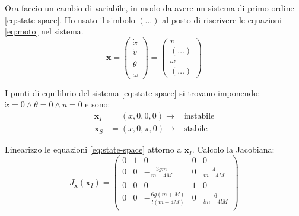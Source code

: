 Ora faccio un cambio di variabile, in modo da avere un sistema di primo ordine \eqref{eq:state-space}.
Ho usato il simbolo $(\ldots)$ al posto di riscrivere le equazioni \eqref{eq:moto} nel sistema.
\begin{equation}
  \dot {\mathbf x} = \left(
  \begin{matrix}
    \dot x \\
    \dot v \\
    \dot \theta \\
    \dot \omega
  \end{matrix}\right) = \left(
  \begin{matrix}
    v \\
    (\ldots) \\
    \omega \\
    (\ldots)
  \end{matrix}
  \right)
  \label{eq:state-space}
\end{equation}

I punti di equilibrio del sistema \eqref{eq:state-space} si trovano imponendo: $\dot x = 0 \land \dot \theta = 0
\land u = 0$ e sono:
\begin{equation}
  \begin{aligned}
    \mathbf x_I &= (x, 0, 0, 0) \to & \text{instabile} \\
    \mathbf x_S &= (x, 0, \pi, 0) \to & \text{stabile}
  \end{aligned}
  \label{eq:punti-equilibrio}
\end{equation}

Linearizzo le equazioni \eqref{eq:state-space} attorno a $\mathbf x_I$.
Calcolo la Jacobiana:
\begin{equation}
  J_{\dot{\mathbf x}}(\mathbf x_I) =
  \left(\begin{array}{ccccc}0&1&0&0&0\\0&0&-\frac{3gm}{m+4M}&0&\frac{4}{m+4M}\\0&0&0&1&0\\0&0&-\frac{6g(m+M)}{l(m+4M)}&0&\frac{6}{lm+4lM}\\\end{array}\right)
  \label{eq:jacobiana}
\end{equation}

